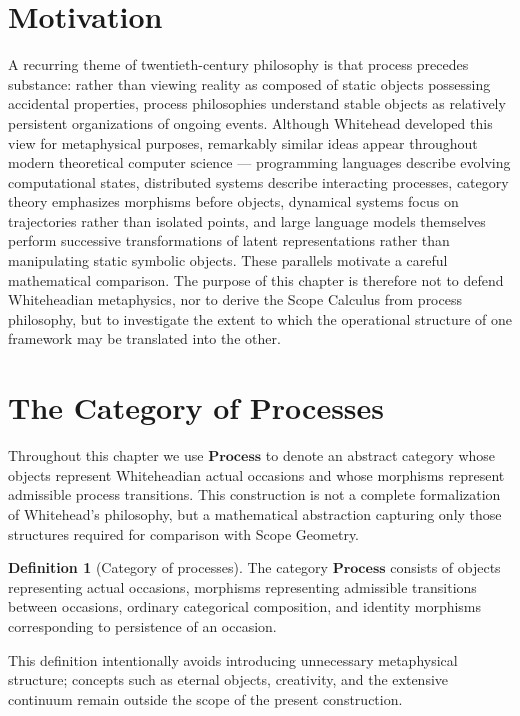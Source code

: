 \documentclass[11pt,twoside,openright]{book}
\numberwithin{equation}{chapter}
\theoremstyle{definition}
\newtheorem{definition}{Definition}[chapter]
\theoremstyle{plain}
\theoremstyle{remark}
\theoremstyle{definition}
\newcommand{\CatProcess}{\mathbf{Process}}
\begin{document}
\section{Motivation}

A recurring theme of twentieth-century philosophy is that process
precedes substance: rather than viewing reality as composed of static
objects possessing accidental properties, process philosophies understand
stable objects as relatively persistent organizations of ongoing events.
Although Whitehead developed this view for metaphysical purposes,
remarkably similar ideas appear throughout modern theoretical computer
science --- programming languages describe evolving computational states,
distributed systems describe interacting processes, category theory
emphasizes morphisms before objects, dynamical systems focus on
trajectories rather than isolated points, and large language models
themselves perform successive transformations of latent representations
rather than manipulating static symbolic objects. These parallels
motivate a careful mathematical comparison. The purpose of this chapter is
therefore not to defend Whiteheadian metaphysics, nor to derive the Scope
Calculus from process philosophy, but to investigate the extent to which
the operational structure of one framework may be translated into the
other.

\section{The Category of Processes}

Throughout this chapter we use $\CatProcess$ to denote an abstract category
whose objects represent Whiteheadian actual occasions and whose morphisms
represent admissible process transitions. This construction is not a
complete formalization of Whitehead's philosophy, but a mathematical
abstraction capturing only those structures required for comparison with
Scope Geometry.

\begin{definition}[Category of processes]
The category $\CatProcess$ consists of objects representing actual
occasions, morphisms representing admissible transitions between
occasions, ordinary categorical composition, and identity morphisms
corresponding to persistence of an occasion.
\end{definition}

This definition intentionally avoids introducing unnecessary metaphysical
structure; concepts such as eternal objects, creativity, and the
extensive continuum remain outside the scope of the present construction.
\end{document}
